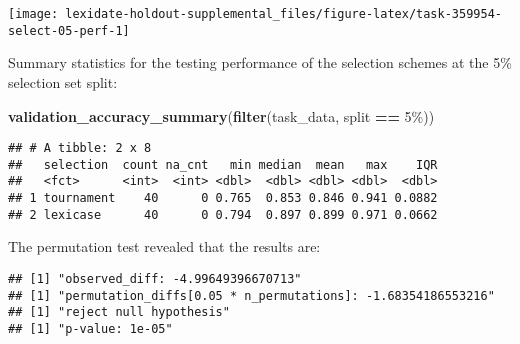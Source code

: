 \documentclass[
]{book}
\newenvironment{Shaded}{\begin{snugshade}}{\end{snugshade}}
\newcommand{\AttributeTok}[1]{\textcolor[rgb]{0.13,0.29,0.53}{#1}}
\newcommand{\DecValTok}[1]{\textcolor[rgb]{0.00,0.00,0.81}{#1}}
\newcommand{\FunctionTok}[1]{\textcolor[rgb]{0.13,0.29,0.53}{\textbf{#1}}}
\newcommand{\NormalTok}[1]{#1}
\newcommand{\OtherTok}[1]{\textcolor[rgb]{0.56,0.35,0.01}{#1}}
\newcommand{\SpecialCharTok}[1]{\textcolor[rgb]{0.81,0.36,0.00}{\textbf{#1}}}
\newcommand{\StringTok}[1]{\textcolor[rgb]{0.31,0.60,0.02}{#1}}
\begin{document}
\texttt{[image: lexidate-holdout-supplemental\_files/figure-latex/task-359954-select-05-perf-1]}

Summary statistics for the testing performance of the selection schemes at the 5\% selection set split:

\begin{Shaded}
\begin{Highlighting}[]
\FunctionTok{validation\_accuracy\_summary}\NormalTok{(}\FunctionTok{filter}\NormalTok{(task\_data, split }\SpecialCharTok{==} \StringTok{\textquotesingle{}5\%\textquotesingle{}}\NormalTok{))}
\end{Highlighting}
\end{Shaded}

\begin{verbatim}
## # A tibble: 2 x 8
##   selection  count na_cnt   min median  mean   max    IQR
##   <fct>      <int>  <int> <dbl>  <dbl> <dbl> <dbl>  <dbl>
## 1 tournament    40      0 0.765  0.853 0.846 0.941 0.0882
## 2 lexicase      40      0 0.794  0.897 0.899 0.971 0.0662
\end{verbatim}

The permutation test revealed that the results are:

\begin{Shaded}
\end{Shaded}

\begin{verbatim}
## [1] "observed_diff: -4.99649396670713"
## [1] "permutation_diffs[0.05 * n_permutations]: -1.68354186553216"
## [1] "reject null hypothesis"
## [1] "p-value: 1e-05"
\end{verbatim}
\end{document}
